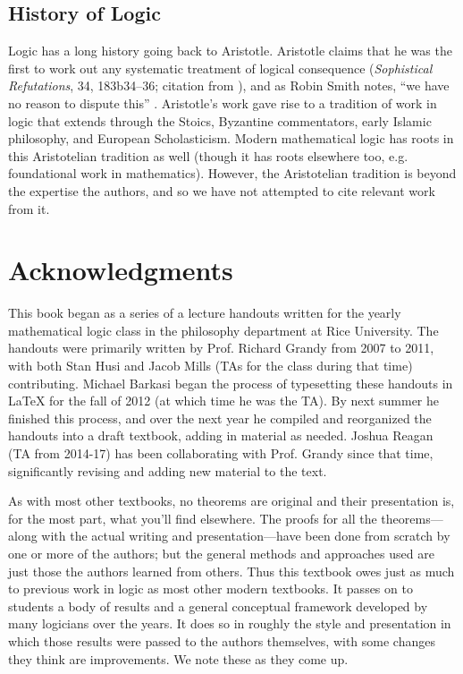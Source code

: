 \documentclass[11pt,fleqn,twoside,openright]{report}%
\let\origdoublepage\cleardoublepage
\newcommand{\clearemptydoublepage}{%
  \clearpage
  {\pagestyle{empty}\origdoublepage}%
}
\let\cleardoublepage\clearemptydoublepage
\begin{document}
\section*{History of Logic}

Logic has a long history going back to Aristotle. 
Aristotle claims that he was the first to work out any systematic treatment of logical consequence (\emph{Sophistical Refutations}, 34, 183b34--36; citation from \citealp[27]{Smith1995}), and as Robin Smith notes, ``we have no reason to dispute this'' \citeyearpar[27]{Smith1995}.
Aristotle's work gave rise to a tradition of work in logic that extends through the Stoics, Byzantine commentators, early Islamic philosophy, and European Scholasticism. 
Modern mathematical logic has roots in this Aristotelian tradition as well (though it has roots elsewhere too, e.g. foundational work in mathematics). 
However, the Aristotelian tradition is beyond the expertise the authors, and so we have not attempted to cite relevant work from it. 

\newpage%
\clearemptydoublepage

\chapter*{Acknowledgments}

\noindent{}This book began as a series of a lecture handouts written for the yearly mathematical logic class in the philosophy department at Rice University. 
The handouts were primarily written by Prof. Richard Grandy from 2007 to 2011, with both Stan Husi and Jacob Mills (TAs for the class during that time) contributing. 
Michael Barkasi began the process of typesetting these handouts in \LaTeX{} for the fall of 2012 (at which time he was the TA).
By next summer he finished this process, and over the next year he compiled and reorganized the handouts into a draft textbook, adding in material as needed. 
Joshua Reagan (TA from 2014-17) has been collaborating with Prof. Grandy since that time, significantly revising and adding new material to the text.

As with most other textbooks, no theorems are original and their presentation is, for the most part, what you'll find elsewhere. 
The proofs for all the theorems---along with the actual writing and presentation---have been done from scratch by one or more of the authors; 
but the general methods and approaches used are just those the authors learned from others. 
Thus this textbook owes just as much to previous work in logic as most other modern textbooks. It passes on to students a body of results and a general conceptual framework developed by many logicians over the years. 
It does so in roughly the style and presentation in which those results were passed to the authors themselves, with some changes they think are improvements. 
We note these as they come up. 
\end{document}
